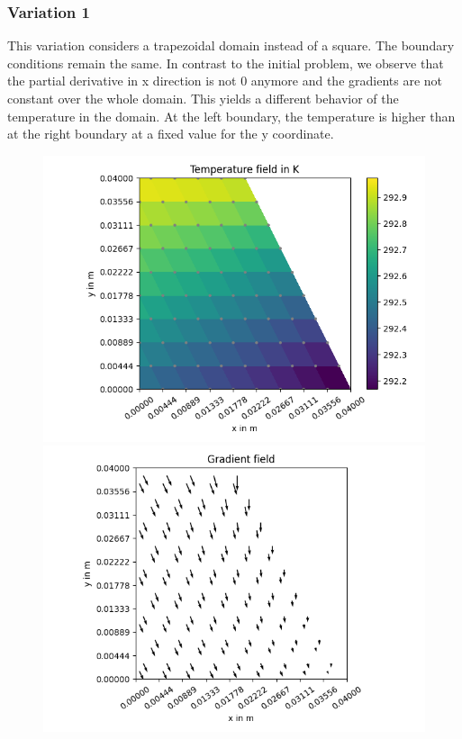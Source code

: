 \documentclass[a4paper,pt]{report}
\begin{document}
\subsubsection*{Variation 1}
This variation considers a trapezoidal domain instead of a square. The boundary conditions remain the same. In contrast to the initial problem, we observe that the partial derivative in x direction is not 0 anymore and the gradients are not constant over the whole domain. This yields a different behavior of the temperature in the domain. At the left boundary, the temperature is higher than at the right boundary at a fixed value for the y coordinate.

\begin{figure}
	\centering
	\includegraphics[scale=0.3]{temperaturefieldV1.png}
	\includegraphics[scale=0.3]{gradientfieldV1.png}

\end{figure}
\end{document}
